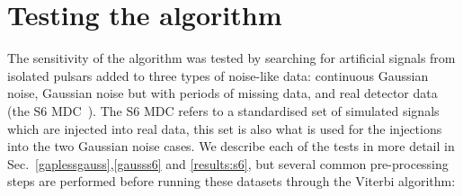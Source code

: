 \section{\label{results} Testing the algorithm}
%
%
The sensitivity of the algorithm was tested by searching for artificial
signals from isolated pulsars added to three types of noise-like data:
continuous Gaussian noise, Gaussian noise but with periods of missing data,
and real detector data (the S6 \ac{MDC}~\cite{Walsh2016}). The S6 \ac{MDC} refers to a standardised set of simulated signals which are injected into real data, this set is also what is used for the injections into the two Gaussian noise cases. We describe each
of the tests in more detail in Sec.~\ref{gaplessgauss},\ref{gausss6} and
\ref{results:s6}, but several common pre-processing steps are performed
before running these datasets through the Viterbi algorithm:
%
%
